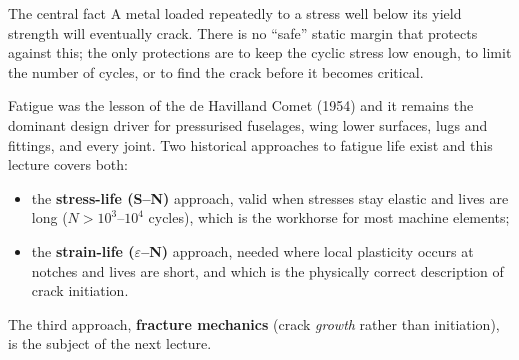 \documentclass[11pt,a4paper]{article}
\begin{document}
\begin{keybox}{The central fact}
A metal loaded repeatedly to a stress well below its yield strength will eventually crack. There is no ``safe'' static margin that protects against this; the only protections are to keep the cyclic stress low enough, to limit the number of cycles, or to find the crack before it becomes critical.
\end{keybox}

Fatigue was the lesson of the de Havilland Comet (1954) and it remains the dominant design driver for pressurised fuselages, wing lower surfaces, lugs and fittings, and every joint. Two historical approaches to fatigue life exist and this lecture covers both:
\begin{itemize}[nosep]
  \item the \textbf{stress-life (S--N)} approach, valid when stresses stay elastic and lives are long ($N>10^{3}$--$10^{4}$ cycles), which is the workhorse for most machine elements;
  \item the \textbf{strain-life ($\varepsilon$--N)} approach, needed where local plasticity occurs at notches and lives are short, and which is the physically correct description of crack initiation.
\end{itemize}
The third approach, \textbf{fracture mechanics} (crack \emph{growth} rather than initiation), is the subject of the next lecture.
\end{document}
